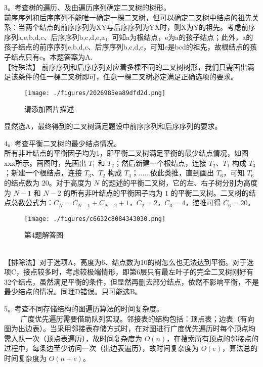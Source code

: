 3。考查树的遍历、及由遍历序列确定二叉树的树形。\\
前序序列和后序序列不能唯一确定一棵二叉树，但可以确定二叉树中结点的祖先关系：当两个结点的前序序列为XY与后序序列为YX时，则X为Y的祖先。考虑前序序列a,e,b,d,c、后序序列b,c,d,e,a，可知a为根结点，e为a的孩子结点；此外，a的孩子结点的前序序列e,b,d,c、后序序列b,c,d,e，可知e是bcd的祖先，故根结点的孩子结点只有e。本题答案为A. \\
【特殊法】 前序序列和后序序列对应着多棵不同的二叉树树形，我们只需画出满足该条件的任一棵二叉树即可，任意一棵二叉树必定满足正确选项的要求。
\begin{figure}[ht]
\centering
\texttt{[image: ./figures/2026985ea89dfd2d.png]}
\caption{请添加图片描述} \label{fig_CSN12_9}
\end{figure}
显然选A，最终得到的二叉树满足题设中前序序列和后序序列的要求。

4。考查平衡二叉树的最少结点情况。\\
所有非叶结点的平衡因子均为1，即平衡二叉树满足平衡的最少结点情况，如图xxx所示。画图时，先画出 $T_1$ 和 $T_2$；然后新建一个根结点，连接 $T_2$、$T_1$ 构成 $T_3$；新建一个根结点，连接 $T_3$、$T_2$ 构成 $T_4$；......依此类推，直到画出 $T_6$，可知 $T_6$ 的结点数为 $20$。对于高度为 $N$ 的题述的平衡二叉树，它的左、右子树分别为高度为 $N-1$ 和 $N-2$ 的所有非叶结点的平衡因子均为 $1$ 的平衡二叉树。二叉树的结点总数公式为：$C_N=C_{N-1}+C_{N-2}+1$，$C_2=2$，$C_3=4$，递推可得 $C_6=20$。
\begin{figure}[ht]
\centering
\texttt{[image: ./figures/c6632c8084343030.png]}
\caption{第4题解答图} \label{fig_CSN12_10}
\end{figure} \\
【排除法】对于选项A，高度为6、结点数为10的树怎么也无法达到平衡。对于选项C，接点较多时，考虑较极端情形，即第6层只有最左叶子的完全二叉树刚好有32个结点，虽然满足平衡的条件，但显然再删去部分结点，依然不影响平衡，不是最少结点的情况。同理D错误。只可能选B。

5。考查不同存储结构的图遍历算法的时间复杂度。\\
$\qquad$ 广度优先遍历需要借助队列实现。邻接表的结构包括：顶点表；边表（有向图为出边表）。当采用邻接表存储方式时，在对图进行广度优先遍历时每个顶点均需入队一次（顶点表遍历），故时间复杂度为 $O(n)$，在搜索所有顶点的邻接点的过程中，每条边至少访问一次（出边表遍历），故时间复杂度为 $O(e)$，算法总的时间复杂度为 $O(n+e)$。

